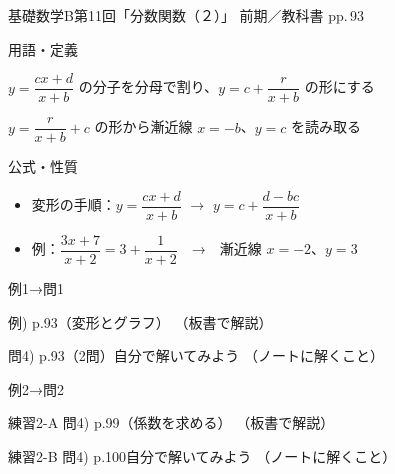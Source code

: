\documentclass[aspectratio=43,professionalfonts,handout]{beamer}
\newcommand{\LectureNum}{11}
\newcommand{\LectureTitle}{分数関数（２）}
\newcommand{\TextPages}{pp.\,93}
\newcommand{\CourseName}{基礎数学B}
\renewcommand{\TermName}{前期}
\begin{document}
\begin{frame}{\CourseName\quad 第\LectureNum 回「\LectureTitle 」}
  {\small \TermName\quad \TeacherName\quad ／\quad 教科書 \TextPages}

  \begin{block}{用語・定義}
  \begin{description}[labelwidth=5.5em]
    \item[\kw{変形の方針}] $y=\dfrac{cx+d}{x+b}$ の分子を分母で割り、$y=c+\dfrac{r}{x+b}$ の形にする
    \item[\kw{漸近線の読み取り}] $y=\dfrac{r}{x+b}+c$ の形から漸近線 $x=-b$、$y=c$ を読み取る
  \end{description}
  \end{block}
\end{frame}

\begin{frame}{公式・性質}
  \begin{block}{}
  \begin{itemize}
    \item 変形の手順：$y=\dfrac{cx+d}{x+b}$ $\longrightarrow$ $y=c+\dfrac{d-bc}{x+b}$
    \item 例：$\dfrac{3x+7}{x+2} = 3+\dfrac{1}{x+2}$　→　漸近線 $x=-2$、$y=3$
  \end{itemize}
  \end{block}
\end{frame}

\begin{frame}{例1→問1}
  \begin{exampleblock}{例) p.93（変形とグラフ）}
    （板書で解説）
  \end{exampleblock}

  \vfill

  \begin{block}{問4) p.93（2問）\quad 自分で解いてみよう}
    （ノートに解くこと）
  \end{block}
\end{frame}

\begin{frame}{例2→問2}
  \begin{exampleblock}{練習2-A 問4) p.99（係数を求める）}
    （板書で解説）
  \end{exampleblock}

  \vfill

  \begin{block}{練習2-B 問4) p.100\quad 自分で解いてみよう}
    （ノートに解くこと）
  \end{block}
\end{frame}
\end{document}
